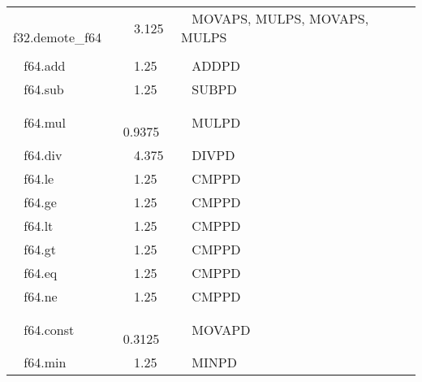 \documentclass{article}
\begin{document}
\begin{table}
\begin{tabular}{|l|l|l|l|}
\multicolumn{1}{l}{~ f32.demote\_f64}       & \multicolumn{1}{l}{~ 3.125}  & \multicolumn{1}{l}{~ MOVAPS, MULPS, MOVAPS, MULPS~~} & \multicolumn{1}{l}{}  \\
\multicolumn{1}{l}{}                        & \multicolumn{1}{l}{}         & \multicolumn{1}{l}{}                                 & \multicolumn{1}{l}{}  \\
\multicolumn{1}{l}{~ f64.add}               & \multicolumn{1}{l}{~ 1.25}   & \multicolumn{1}{l}{~ ADDPD}                          & \multicolumn{1}{l}{}  \\
\multicolumn{1}{l}{~ f64.sub}               & \multicolumn{1}{l}{~ 1.25}   & \multicolumn{1}{l}{~ SUBPD}                          & \multicolumn{1}{l}{}  \\
\multicolumn{1}{l}{~ f64.mul}               & \multicolumn{1}{l}{~ 0.9375} & \multicolumn{1}{l}{~ MULPD}                          & \multicolumn{1}{l}{}  \\
\multicolumn{1}{l}{~ f64.div}               & \multicolumn{1}{l}{~ 4.375}  & \multicolumn{1}{l}{~ DIVPD}                          & \multicolumn{1}{l}{}  \\
\multicolumn{1}{l}{~ f64.le}                & \multicolumn{1}{l}{~ 1.25}   & \multicolumn{1}{l}{~ CMPPD}                          & \multicolumn{1}{l}{}  \\
\multicolumn{1}{l}{~ f64.ge}                & \multicolumn{1}{l}{~ 1.25}   & \multicolumn{1}{l}{~ CMPPD}                          & \multicolumn{1}{l}{}  \\
\multicolumn{1}{l}{~ f64.lt}                & \multicolumn{1}{l}{~ 1.25}   & \multicolumn{1}{l}{~ CMPPD}                          & \multicolumn{1}{l}{}  \\
\multicolumn{1}{l}{~ f64.gt}                & \multicolumn{1}{l}{~ 1.25}   & \multicolumn{1}{l}{~ CMPPD}                          & \multicolumn{1}{l}{}  \\
\multicolumn{1}{l}{~ f64.eq}                & \multicolumn{1}{l}{~ 1.25}   & \multicolumn{1}{l}{~ CMPPD}                          & \multicolumn{1}{l}{}  \\
\multicolumn{1}{l}{~ f64.ne}                & \multicolumn{1}{l}{~ 1.25}   & \multicolumn{1}{l}{~ CMPPD}                          & \multicolumn{1}{l}{}  \\
\multicolumn{1}{l}{~ f64.const}             & \multicolumn{1}{l}{~ 0.3125} & \multicolumn{1}{l}{~ MOVAPD}                         & \multicolumn{1}{l}{}  \\
\multicolumn{1}{l}{~ f64.min}               & \multicolumn{1}{l}{~ 1.25}   & \multicolumn{1}{l}{~ MINPD}                          & \multicolumn{1}{l}{}  \\

\end{tabular}
\end{table}
\end{document}
